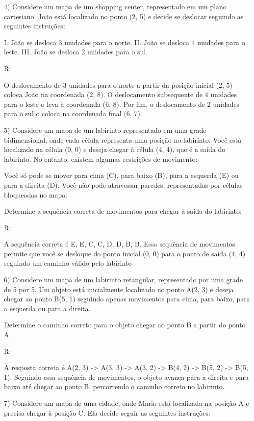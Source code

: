 4) Considere um mapa de um shopping center, representado em um plano
cartesiano. João está localizado no ponto (2, 5) e decide se deslocar
seguindo as seguintes instruções:

I. João se desloca 3 unidades para o norte. II. João se desloca 4
unidades para o leste. III. João se desloca 2 unidades para o sul.

R:

O deslocamento de 3 unidades para o norte a partir da posição inicial
(2, 5) coloca João na coordenada (2, 8). O deslocamento subsequente de 4
unidades para o leste o leva à coordenada (6, 8). Por fim, o
deslocamento de 2 unidades para o sul o coloca na coordenada final (6,
7).

5) Considere um mapa de um labirinto representado em uma grade
bidimensional, onde cada célula representa uma posição no labirinto.
Você está localizado na célula (0, 0) e deseja chegar à célula (4, 4),
que é a saída do labirinto. No entanto, existem algumas restrições de
movimento:

Você só pode se mover para cima (C), para baixo (B), para a esquerda (E)
ou para a direita (D). Você não pode atravessar paredes, representadas
por células bloqueadas no mapa.

Determine a sequência correta de movimentos para chegar à saída do
labirinto:

R:

A sequência correta é E, E, C, C, D, D, B, B. Essa sequência de
movimentos permite que você se desloque do ponto inicial (0, 0) para o
ponto de saída (4, 4) seguindo um caminho válido pelo labirinto

6) Considere um mapa de um labirinto retangular, representado por uma
grade de 5 por 5. Um objeto está inicialmente localizado no ponto A(2,
3) e deseja chegar ao ponto B(5, 1) seguindo apenas movimentos para
cima, para baixo, para a esquerda ou para a direita.

Determine o caminho correto para o objeto chegar ao ponto B a partir do
ponto A.

R:

A resposta correta é A(2, 3) -\textgreater{} A(3, 3) -\textgreater{}
A(3, 2) -\textgreater{} B(4, 2) -\textgreater{} B(5, 2) -\textgreater{}
B(5, 1). Seguindo essa sequência de movimentos, o objeto avança para a
direita e para baixo até chegar ao ponto B, percorrendo o caminho
correto no labirinto.

7) Considere um mapa de uma cidade, onde Maria está localizada na
posição A e precisa chegar à posição C. Ela decide seguir as seguintes
instruções:

